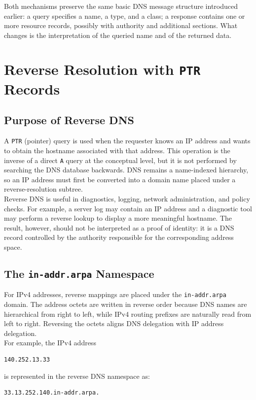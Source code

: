 \documentclass{scrbook}
\begin{document}
	Both mechanisms preserve the same basic DNS message structure introduced earlier: a query specifies a name, a type, and a class; a response contains one or more resource records, possibly with authority and additional sections. What changes is the interpretation of the queried name and of the returned data.
	
	\section{Reverse Resolution with \texttt{PTR} Records}
	
	\subsection{Purpose of Reverse DNS}
	
	A \texttt{PTR} (pointer) query is used when the requester knows an IP address and wants to obtain the hostname associated with that address. This operation is the inverse of a direct \texttt{A} query at the conceptual level, but it is not performed by searching the DNS database backwards. DNS remains a name-indexed hierarchy, so an IP address must first be converted into a domain name placed under a reverse-resolution subtree.\\
	
	Reverse DNS is useful in diagnostics, logging, network administration, and policy checks. For example, a server log may contain an IP address and a diagnostic tool may perform a reverse lookup to display a more meaningful hostname. The result, however, should not be interpreted as a proof of identity: it is a DNS record controlled by the authority responsible for the corresponding address space.
	
	\subsection{The \texttt{in-addr.arpa} Namespace}
	
	For IPv4 addresses, reverse mappings are placed under the \texttt{in-addr.arpa} domain. The address octets are written in reverse order because DNS names are hierarchical from right to left, while IPv4 routing prefixes are naturally read from left to right. Reversing the octets aligns DNS delegation with IP address delegation.\\
	
	For example, the IPv4 address
	\begin{lstlisting}
140.252.13.33
	\end{lstlisting}
	is represented in the reverse DNS namespace as:
	\begin{lstlisting}
33.13.252.140.in-addr.arpa.
	\end{lstlisting}
	
\end{document}
